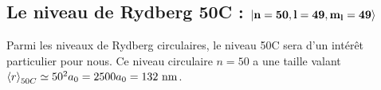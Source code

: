 \subsection{Le niveau de Rydberg 50C : $\mathbf{\ket{n=50,l=49,m_l=49}}$}
%
\noindent Parmi les niveaux de Rydberg circulaires, le niveau 50C sera d'un intérêt particulier pour nous.
Ce niveau circulaire $n=50$ a une taille valant $\braket{r}_{50C} \simeq 50^2 a_0 = 2500 a_0 = \numv{132}\si{\nano\meter}$.
	

